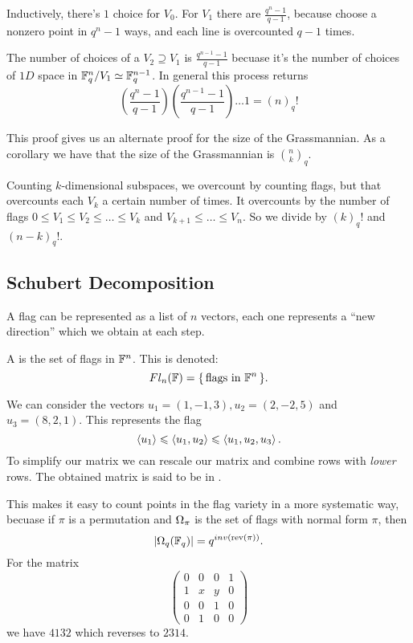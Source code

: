 \documentclass[12pt]{memoir}
\begin{document}
\begin{ptcbp}
    Inductively, there's $1$ choice for $V_0$. For $V_1$ there are $\frac{q^n-1}{q-1}$, because choose a nonzero point in $q^n-1$ ways, and each line is overcounted $q-1$ times.\par 
    The number of choices of a $V_2\supseteq V_1$ is $\frac{q^{n-1}-1}{q-1}$ becuase it's the number of choices of $1D$ space in $\mathbb{F}^n_q/V_1\simeq \mathbb{F}_q^{n-1}$. In general this process returns 
    $$\left(\frac{q^n-1}{q-1}\right)\left(\frac{q^{n-1}-1}{q-1}\right)\dots 1=(n)_q!$$
\end{ptcbp}
This proof gives us an alternate proof for the size of the Grassmannian. As a corollary we have that the size of the Grassmannian is $\binom{n}{k}_q$.\par 
Counting $k$-dimensional subspaces, we overcount by counting flags, but that overcounts each $V_k$ a certain number of times. It overcounts by the number of flags $0\leq V_1\leq V_2\leq\dots\leq V_k$ and $V_{k+1}\leq\dots\leq V_n$. So we divide by $(k)_q!$ and $(n-k)_q!$.

\subsection{Schubert Decomposition}

A flag can be represented as a list of $n$ vectors, each one represents a ``new direction'' which we obtain at each step.

\begin{Def}
    A  is the set of flags in $\mathbb{F}^n$. This is denoted:
    $$Fl_n(\mathbb{F})=\{\,\text{flags in }\mathbb{F}^n\,\}.$$
\end{Def}

\begin{Ex}
    We can consider the vectors $u_1=(1,-1,3), u_2=(2,-2,5)$ and $u_3=(8,2,1)$. This represents the flag 
    $$\left\langle u_1\right\rangle\leqslant\left\langle u_1,u_2\right\rangle\leqslant\left\langle u_1,u_2,u_3\right\rangle.$$
    To simplify our matrix we can rescale our matrix and combine rows with \emph{lower} rows. The obtained matrix is said to be in .
\end{Ex}

This makes it easy to count points in the flag variety in a more systematic way, becuase if $\pi$ is a permutation and $\Omega_\pi$ is the set of flags with normal form $\pi$, then 
$$|\Omega_q(\mathbb{F}_q)|=q^{inv(\text{rev}(\pi))}.$$
For the matrix 
$$\begin{pmatrix}
    0&0&0&1\\1&x&y&0\\0&0&1&0\\0&1&0&0
\end{pmatrix}$$
we have $4132$ which reverses to $2314$.
\end{document}
